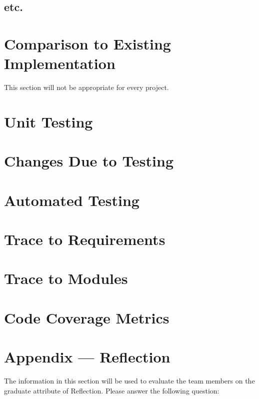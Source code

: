 \documentclass[12pt, titlepage]{article}
\begin{document}
\subsection{etc.}
	
\section{Comparison to Existing Implementation}	

This section will not be appropriate for every project.

\section{Unit Testing}

\section{Changes Due to Testing}


\section{Automated Testing}
		
\section{Trace to Requirements}
		
\section{Trace to Modules}		

\section{Code Coverage Metrics}




\newpage{}
\section*{Appendix --- Reflection}

The information in this section will be used to evaluate the team members on the
graduate attribute of Reflection.  Please answer the following question:
\end{document}
